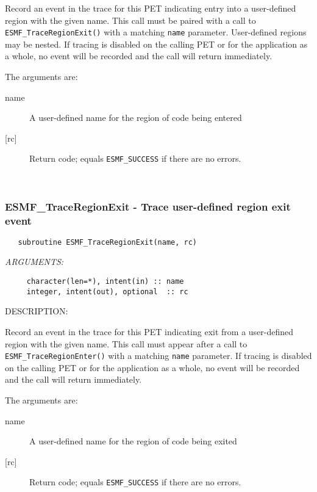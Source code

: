      Record an event in the trace for this PET indicating entry
     into a user-defined region with the given name.  This call
     must be paired with a call to {\tt ESMF\_TraceRegionExit()}
     with a matching {\tt name} parameter.  User-defined regions may be
     nested.
     If tracing is disabled on the calling PET or for the application
     as a whole, no event will be recorded and
     the call will return immediately.
  
   The arguments are:
   \begin{description}
   \item[{name}]
     A user-defined name for the region of code being entered
   \item[{[rc]}]
     Return code; equals {\tt ESMF\_SUCCESS} if there are no errors.
   \end{description}     
 
\mbox{}\hrulefill\ 
 
\subsubsection [ESMF\_TraceRegionExit] {ESMF\_TraceRegionExit - Trace user-defined region exit event}


   
\begin{verbatim}   subroutine ESMF_TraceRegionExit(name, rc)\end{verbatim}{\em ARGUMENTS:}
\begin{verbatim}     character(len=*), intent(in) :: name
     integer, intent(out), optional  :: rc\end{verbatim}
{\sf DESCRIPTION:\\ }


     Record an event in the trace for this PET indicating exit
     from a user-defined region with the given name.  This call
     must appear after a call to {\tt ESMF\_TraceRegionEnter()}
     with a matching {\tt name} parameter.
     If tracing is disabled on the calling PET or for the application
     as a whole, no event will be recorded and
     the call will return immediately.
  
   The arguments are:
   \begin{description}
   \item[{name}]
     A user-defined name for the region of code being exited
   \item[{[rc]}]
     Return code; equals {\tt ESMF\_SUCCESS} if there are no errors.
   \end{description}    
\setlength{\parskip}{\oldparskip}
\setlength{\parindent}{\oldparindent}
\setlength{\baselineskip}{\oldbaselineskip}

